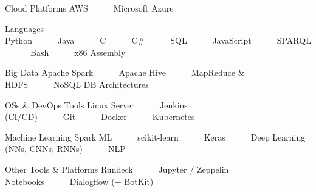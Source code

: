 

\begin{cvskills}

\cvskill
{Cloud Platforms} %
{AWS~~~\textbullet~~~Microsoft Azure} %

  \cvskill
    {Languages} %
    {Python~~~\textbullet~~~Java~~~\textbullet~~~C~~~\textbullet~~~C\#~~~\textbullet~~~SQL~~~\textbullet~~~JavaScript~~~\textbullet~~~SPARQL~~~\textbullet~~~Bash~~~\textbullet~~~x86 Assembly} %

  \cvskill
    {Big Data} %
    {Apache Spark~~~\textbullet~~~Apache Hive~~~\textbullet~~~MapReduce \& HDFS~~~\textbullet~~~NoSQL DB Architectures} %
    
  \cvskill
    {OSs \& DevOps Tools} %
    {Linux Server~~~\textbullet~~~Jenkins (CI/CD)~~~\textbullet~~~Git~~~\textbullet~~~Docker~~~\textbullet~~~Kubernetes} %

  \cvskill
    {Machine Learning} %
    {Spark ML~~~\textbullet~~~scikit-learn~~~\textbullet~~~Keras~~~\textbullet~~~Deep Learning (NNs, CNNs, RNNs)~~~\textbullet~~~NLP} %

  \cvskill
    {Other Tools \& Platforms} %
    {Rundeck~~~\textbullet~~~Jupyter / Zeppelin Notebooks~~~\textbullet~~~Dialogflow (+ BotKit)} %

\end{cvskills}
